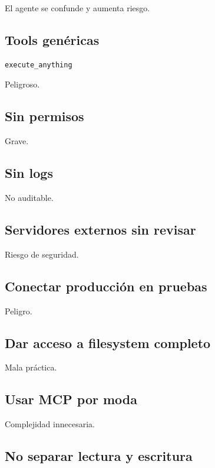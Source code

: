 El agente se confunde y aumenta riesgo.

\subsection{Tools genéricas}\label{tools-genuxe9ricas}

\begin{lstlisting}
execute_anything
\end{lstlisting}

Peligroso.

\subsection{Sin permisos}\label{sin-permisos-4}

Grave.

\subsection{Sin logs}\label{sin-logs-5}

No auditable.

\subsection{Servidores externos sin
revisar}\label{servidores-externos-sin-revisar}

Riesgo de seguridad.

\subsection{Conectar producción en
pruebas}\label{conectar-producciuxf3n-en-pruebas}

Peligro.

\subsection{Dar acceso a filesystem
completo}\label{dar-acceso-a-filesystem-completo}

Mala práctica.

\subsection{Usar MCP por moda}\label{usar-mcp-por-moda}

Complejidad innecesaria.

\subsection{No separar lectura y
escritura}\label{no-separar-lectura-y-escritura}

